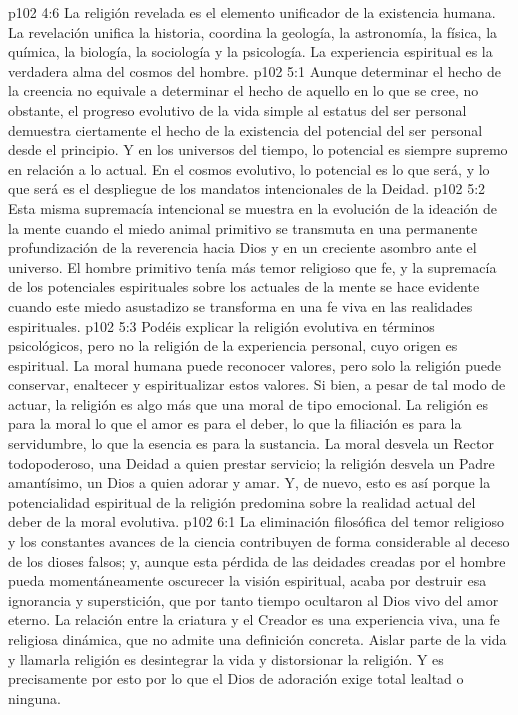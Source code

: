 \vs p102 4:6 \pc La religión revelada es el elemento unificador de la existencia humana. La revelación unifica la historia, coordina la geología, la astronomía, la física, la química, la biología, la sociología y la psicología. La experiencia espiritual es la verdadera alma del cosmos del hombre.
\vs p102 5:1 Aunque determinar el hecho de la creencia no equivale a determinar el hecho de aquello en lo que se cree, no obstante, el progreso evolutivo de la vida simple al estatus del ser personal demuestra ciertamente el hecho de la existencia del potencial del ser personal desde el principio. Y en los universos del tiempo, lo potencial es siempre supremo en relación a lo actual. En el cosmos evolutivo, lo potencial es lo que será, y lo que será es el despliegue de los mandatos intencionales de la Deidad.
\vs p102 5:2 Esta misma supremacía intencional se muestra en la evolución de la ideación de la mente cuando el miedo animal primitivo se transmuta en una permanente profundización de la reverencia hacia Dios y en un creciente asombro ante el universo. El hombre primitivo tenía más temor religioso que fe, y la supremacía de los potenciales espirituales sobre los actuales de la mente se hace evidente cuando este miedo asustadizo se transforma en una fe viva en las realidades espirituales.
\vs p102 5:3 Podéis explicar la religión evolutiva en términos psicológicos, pero no la religión de la experiencia personal, cuyo origen es espiritual. La moral humana puede reconocer valores, pero solo la religión puede conservar, enaltecer y espiritualizar estos valores. Si bien, a pesar de tal modo de actuar, la religión es algo más que una moral de tipo emocional. La religión es para la moral lo que el amor es para el deber, lo que la filiación es para la servidumbre, lo que la esencia es para la sustancia. La moral desvela un Rector todopoderoso, una Deidad a quien prestar servicio; la religión desvela un Padre amantísimo, un Dios a quien adorar y amar. Y, de nuevo, esto es así porque la potencialidad espiritual de la religión predomina sobre la realidad actual del deber de la moral evolutiva.
\vs p102 6:1 La eliminación filosófica del temor religioso y los constantes avances de la ciencia contribuyen de forma considerable al deceso de los dioses falsos; y, aunque esta pérdida de las deidades creadas por el hombre pueda momentáneamente oscurecer la visión espiritual, acaba por destruir esa ignorancia y superstición, que por tanto tiempo ocultaron al Dios vivo del amor eterno. La relación entre la criatura y el Creador es una experiencia viva, una fe religiosa dinámica, que no admite una definición concreta. Aislar parte de la vida y llamarla religión es desintegrar la vida y distorsionar la religión. Y es precisamente por esto por lo que el Dios de adoración exige total lealtad o ninguna.
